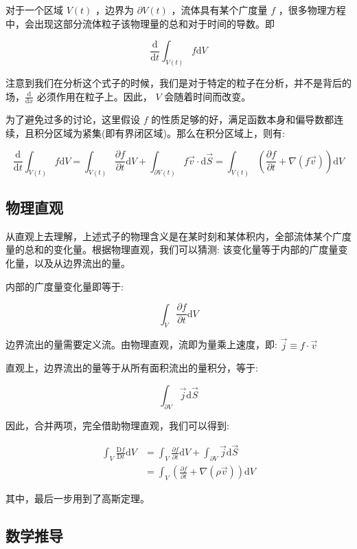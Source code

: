 \documentclass[fontset=windows]{article}
\begin{document}
对于一个区域 $ V(t) $ ，边界为 $ \partial V(t) $ ，流体具有某个广度量 $f$ ，很多物理方程中，会出现这部分流体粒子该物理量的总和对于时间的导数。即

$$
\frac{\mathrm{d}}{\mathrm{d}t} \int_{V(t)} f \mathrm{d}V
$$

注意到我们在分析这个式子的时候，我们是对于特定的粒子在分析，并不是背后的场，$\frac{\mathrm{d}}{\mathrm{d}x}$ 必须作用在粒子上。因此， $V$ 会随着时间而改变。

为了避免过多的讨论，这里假设 $ f $ 的性质足够的好，满足函数本身和偏导数都连续，且积分区域为紧集(即有界闭区域)。那么在积分区域上，则有:

$$
\frac{\mathrm{d}}{\mathrm{d}t} \int_{V(t)} f \mathrm{d}V
= \int_{V(t)} \frac{\partial f}{\partial t} \mathrm{d}V +
  \int_{\partial V(t)} {f \vec{v} \cdot \mathrm{d}\vec{S}}
= \int_{V(t)} (\frac{\partial f}{\partial t} + \nabla (f \vec{v})) \mathrm{d}V
$$

\subsection*{物理直观}

从直观上去理解，上述式子的物理含义是在某时刻和某体积内，全部流体某个广度量的总和的变化量。根据物理直观，我们可以猜测: 该变化量等于内部的广度量变化量，以及从边界流出的量。

内部的广度量变化量即等于: 

$$
\int_V \frac{\partial f}{\partial t} \mathrm{d}V
$$

边界流出的量需要定义流。由物理直观，流即为量乘上速度，即: $ \vec{j} \equiv f \cdot \vec{v} $

直观上，边界流出的量等于从所有面积流出的量积分，等于:

$$
\int_{\partial V} \vec{j} \mathrm{d} \vec{S}
$$

因此，合并两项，完全借助物理直观，我们可以得到:

$$
\begin{aligned}
    \int_V \frac{\mathrm{D}f}{\mathrm{D}t} \mathrm{d}V
        &= \int_V \frac{\partial f}{\partial t} \mathrm{d}V +
            \int_{\partial V} \vec{j} \mathrm{d} \vec{S}      \\
        &= \int_V (\frac{\partial f}{\partial t} + \nabla (\rho \vec{v})) \mathrm{d}V
\end{aligned}
$$

其中，最后一步用到了高斯定理。

\subsection*{数学推导}
\end{document}
